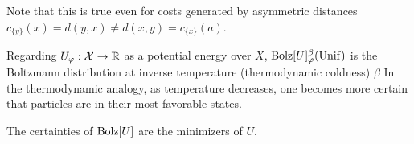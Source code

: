 \documentclass{article}
\newcommand{\Unif}{\mathrm{Unif}}
\begin{document}
Note that this is true even for costs generated by asymmetric distances $c_{\{y\}}(x) = d(y, x) \ne d(x,y) = c_{\{x\}}(a)$.


\begin{remark}
    Regarding $U_\varphi : \mathcal X \to \mathbb R$ as a potential energy over $X$,
    $\Bolz U^\beta_\varphi(\Unif)$ is the Boltzmann distribution at inverse temperature (thermodynamic coldness) $\beta$
    In the thermodynamic analogy, as temperature decreases, one becomes more certain that particles are in their most favorable states.
\end{remark}


The certainties of $\mathrm{Bolz}[U]$ are the minimizers of $U$.
\end{document}
